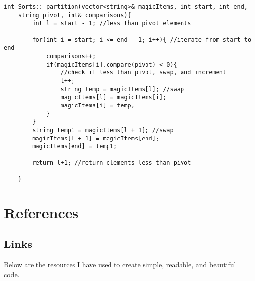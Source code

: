 \documentclass[letterpaper, 10pt,DIV=13]{scrartcl}
\numberwithin{equation}{section} %
\numberwithin{figure}{section} %
\numberwithin{table}{section} %
\begin{document}
\begin{lstlisting}[frame=single, ]
    int Sorts:: partition(vector<string>& magicItems, int start, int end,
    string pivot, int& comparisons){
        int l = start - 1; //less than pivot elements
    
        for(int i = start; i <= end - 1; i++){ //iterate from start to end
            comparisons++;
            if(magicItems[i].compare(pivot) < 0){ 
                //check if less than pivot, swap, and increment
                l++;
                string temp = magicItems[l]; //swap
                magicItems[l] = magicItems[i];
                magicItems[i] = temp;
            }
        }
        string temp1 = magicItems[l + 1]; //swap
        magicItems[l + 1] = magicItems[end];
        magicItems[end] = temp1;
    
        return l+1; //return elements less than pivot
    
    }

\end{lstlisting}

\pagebreak

\section{References}

\subsection{Links}
Below are the resources I have used to create simple, readable, and beautiful code.
\end{document}
